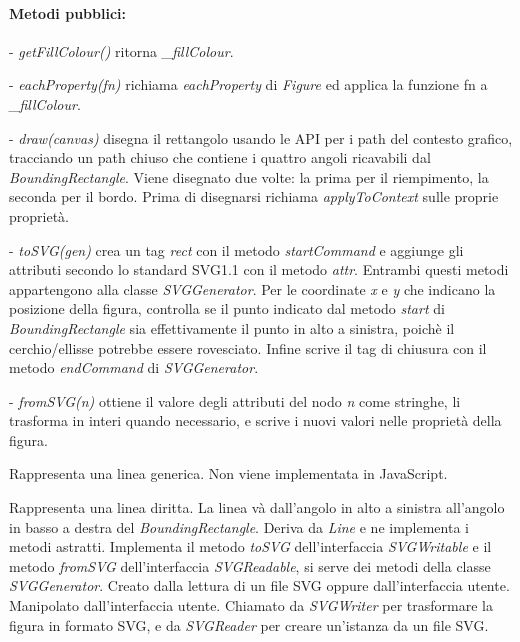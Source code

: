 \paragraph{Metodi pubblici:}
\begin{elencopuntato}[\subsubsecindent]
\item[-] \textit{getFillColour()} ritorna \textit{{\_}fillColour}.
\item[-] \textit{eachProperty(fn)} richiama \textit{eachProperty} di \textit{Figure} ed applica la funzione fn a \textit{{\_}fillColour}.
\item[-] \textit{draw(canvas)} disegna il rettangolo usando le API per i path del contesto grafico, tracciando un path chiuso che contiene i quattro angoli ricavabili dal \textit{BoundingRectangle}. Viene disegnato due volte: la prima per il riempimento, la seconda per il bordo. Prima di disegnarsi richiama \textit{applyToContext} sulle proprie propriet\`a.
\item[-] \textit{toSVG(gen)} crea un tag \textit{rect} con il metodo \textit{startCommand} e aggiunge gli attributi secondo lo standard SVG1.1 con il metodo \textit{attr}. Entrambi questi metodi appartengono alla classe \textit{SVGGenerator}. Per le coordinate \textit{x} e \textit{y} che indicano la posizione della figura, controlla se il punto indicato dal metodo \textit{start} di \textit{BoundingRectangle} sia effettivamente il punto in alto a sinistra, poich\`e il cerchio/ellisse potrebbe essere rovesciato. Infine scrive il tag di chiusura con il metodo \textit{endCommand} di \textit{SVGGenerator}.
\item[-] \textit{fromSVG(n)} ottiene il valore degli attributi del nodo \textit{n} come stringhe, li trasforma in interi quando necessario, e scrive i nuovi valori nelle propriet\`a della figura. 
\end{elencopuntato}

Rappresenta una linea generica. Non viene implementata in JavaScript.

Rappresenta una linea diritta. La linea v\`a dall'angolo in alto a sinistra all'angolo in basso a destra del \textit{BoundingRectangle}.
Deriva da \textit{Line} e ne implementa i metodi astratti. Implementa il metodo \textit{toSVG} dell'interfaccia \textit{SVGWritable} e il metodo \textit{fromSVG} dell'interfaccia \textit{SVGReadable}, si serve dei metodi della classe \textit{SVGGenerator}.
Creato dalla lettura di un file SVG oppure dall'interfaccia utente. Manipolato dall'interfaccia utente. Chiamato da \textit{SVGWriter} per trasformare la figura in formato SVG, e da \textit{SVGReader} per creare un'istanza da un file SVG.
